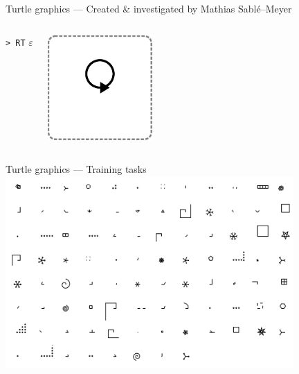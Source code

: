 \documentclass{beamer}
\begin{document}
\begin{frame}{Turtle graphics --- \small{Created \& investigated by Mathias
  Sablé--Meyer}}
{\begin{columns}[T]
\begin{mycode}
          \texttt{> RT} $\varepsilon$\\
          \vspace*{3\baselineskip}
        \end{mycode}
        \includegraphics[width = 4cm]{figures/teachLogo/circle.eps}
    \end{columns}
  }
\end{frame}

\begin{frame}{Turtle graphics --- Training tasks}
  \centering
  \includegraphics[width=11cm]{figures/tasksMinusBehaviour.png}
\end{frame}
\end{document}
